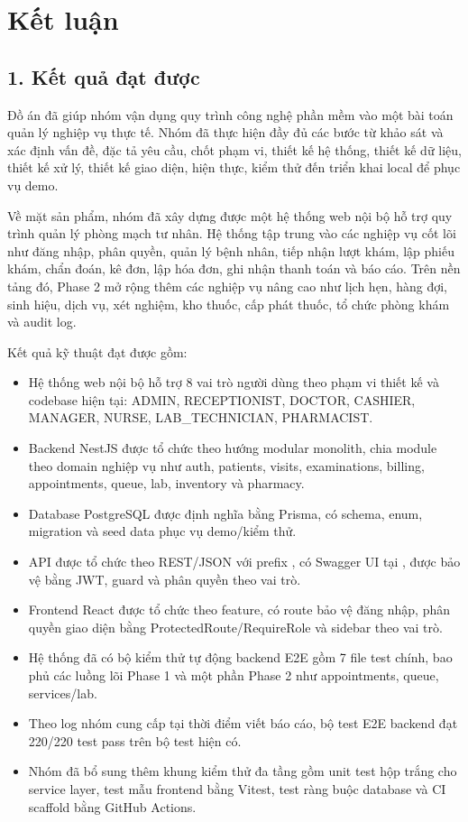 
\chapter*{Kết luận}

\section*{1. Kết quả đạt được}

Đồ án \textbf{\projecttitle} đã giúp nhóm vận dụng quy trình công nghệ phần mềm vào một bài toán quản lý nghiệp vụ thực tế. Nhóm đã thực hiện đầy đủ các bước từ khảo sát và xác định vấn đề, đặc tả yêu cầu, chốt phạm vi, thiết kế hệ thống, thiết kế dữ liệu, thiết kế xử lý, thiết kế giao diện, hiện thực, kiểm thử đến triển khai local để phục vụ demo.

Về mặt sản phẩm, nhóm đã xây dựng được một hệ thống web nội bộ hỗ trợ quy trình quản lý phòng mạch tư nhân. Hệ thống tập trung vào các nghiệp vụ cốt lõi như đăng nhập, phân quyền, quản lý bệnh nhân, tiếp nhận lượt khám, lập phiếu khám, chẩn đoán, kê đơn, lập hóa đơn, ghi nhận thanh toán và báo cáo. Trên nền tảng đó, Phase 2 mở rộng thêm các nghiệp vụ nâng cao như lịch hẹn, hàng đợi, sinh hiệu, dịch vụ, xét nghiệm, kho thuốc, cấp phát thuốc, tổ chức phòng khám và audit log.

Kết quả kỹ thuật đạt được gồm:

\begin{itemize}
    \item Hệ thống web nội bộ hỗ trợ 8 vai trò người dùng theo phạm vi thiết kế và codebase hiện tại: ADMIN, RECEPTIONIST, DOCTOR, CASHIER, MANAGER, NURSE, LAB\_TECHNICIAN, PHARMACIST.
    \item Backend NestJS được tổ chức theo hướng modular monolith, chia module theo domain nghiệp vụ như auth, patients, visits, examinations, billing, appointments, queue, lab, inventory và pharmacy.
    \item Database PostgreSQL được định nghĩa bằng Prisma, có schema, enum, migration và seed data phục vụ demo/kiểm thử.
    \item API được tổ chức theo REST/JSON với prefix , có Swagger UI tại , được bảo vệ bằng JWT, guard và phân quyền theo vai trò.
    \item Frontend React được tổ chức theo feature, có route bảo vệ đăng nhập, phân quyền giao diện bằng ProtectedRoute/RequireRole và sidebar theo vai trò.
    \item Hệ thống đã có bộ kiểm thử tự động backend E2E gồm 7 file test chính, bao phủ các luồng lõi Phase 1 và một phần Phase 2 như appointments, queue, services/lab.
    \item Theo log nhóm cung cấp tại thời điểm viết báo cáo, bộ test E2E backend đạt 220/220 test pass trên bộ test hiện có.
    \item Nhóm đã bổ sung thêm khung kiểm thử đa tầng gồm unit test hộp trắng cho service layer, test mẫu frontend bằng Vitest, test ràng buộc database và CI scaffold bằng GitHub Actions.
\end{itemize}

